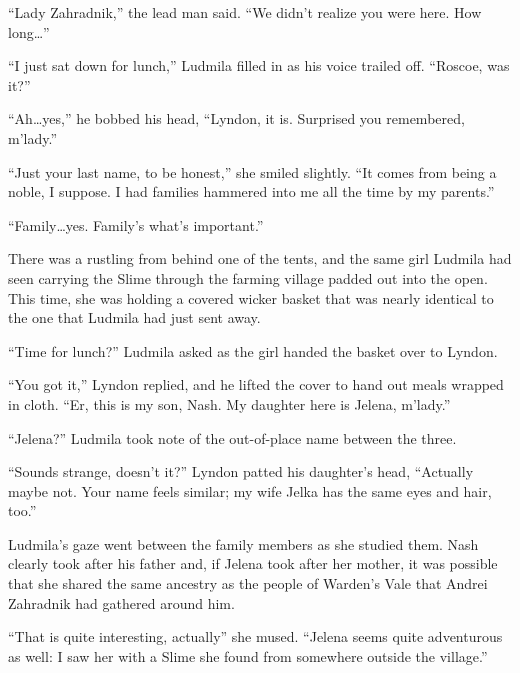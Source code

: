  

“Lady Zahradnik,” the lead man said. “We didn’t realize you were here. How long…”

 

“I just sat down for lunch,” Ludmila filled in as his voice trailed off. “Roscoe, was it?”

 

“Ah…yes,” he bobbed his head, “Lyndon, it is. Surprised you remembered, m’lady.”

 

“Just your last name, to be honest,” she smiled slightly. “It comes from being a noble, I suppose. I had families hammered into me all the time by my parents.”

 

“Family…yes. Family’s what’s important.”

 

There was a rustling from behind one of the tents, and the same girl Ludmila had seen carrying the Slime through the farming village padded out into the open. This time, she was holding a covered wicker basket that was nearly identical to the one that Ludmila had just sent away.

 

“Time for lunch?” Ludmila asked as the girl handed the basket over to Lyndon.

 

“You got it,” Lyndon replied, and he lifted the cover to hand out meals wrapped in cloth. “Er, this is my son, Nash. My daughter here is Jelena, m’lady.”

 

“Jelena?” Ludmila took note of the out-of-place name between the three.

 

“Sounds strange, doesn’t it?” Lyndon patted his daughter’s head, “Actually maybe not. Your name feels similar; my wife Jelka has the same eyes and hair, too.”

 

Ludmila’s gaze went between the family members as she studied them. Nash clearly took after his father and, if Jelena took after her mother, it was possible that she shared the same ancestry as the people of Warden’s Vale that Andrei Zahradnik had gathered around him.

 

“That is quite interesting, actually” she mused. “Jelena seems quite adventurous as well: I saw her with a Slime she found from somewhere outside the village.”


